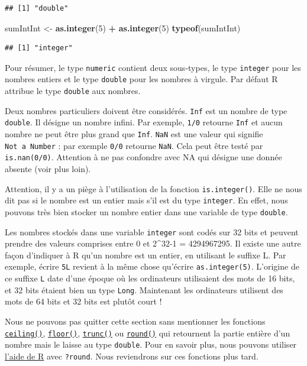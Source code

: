 \documentclass[
]{book}
\newenvironment{Shaded}{\begin{snugshade}}{\end{snugshade}}
\newcommand{\DecValTok}[1]{\textcolor[rgb]{0.00,0.00,0.81}{#1}}
\newcommand{\KeywordTok}[1]{\textcolor[rgb]{0.13,0.29,0.53}{\textbf{#1}}}
\newcommand{\NormalTok}[1]{#1}
\newcommand{\OperatorTok}[1]{\textcolor[rgb]{0.81,0.36,0.00}{\textbf{#1}}}
\newcommand{\StringTok}[1]{\textcolor[rgb]{0.31,0.60,0.02}{#1}}
\begin{document}
\begin{verbatim}
## [1] "double"
\end{verbatim}

\begin{Shaded}
\begin{Highlighting}[]
\NormalTok{sumIntInt <-}\StringTok{ }\KeywordTok{as.integer}\NormalTok{(}\DecValTok{5}\NormalTok{) }\OperatorTok{+}\StringTok{ }\KeywordTok{as.integer}\NormalTok{(}\DecValTok{5}\NormalTok{)}
\KeywordTok{typeof}\NormalTok{(sumIntInt)}
\end{Highlighting}
\end{Shaded}

\begin{verbatim}
## [1] "integer"
\end{verbatim}

Pour résumer, le type \texttt{numeric} contient deux sous-types, le type \texttt{integer} pour les nombres entiers et le type \texttt{double} pour les nombres à virgule. Par défaut R attribue le type \texttt{double} aux nombres.

Deux nombres particuliers doivent être considérés. \texttt{Inf} est un nombre de type \texttt{double}. Il désigne un nombre infini. Par exemple, \texttt{1/0} retourne \texttt{Inf} et aucun nombre ne peut être plus grand que \texttt{Inf}. \texttt{NaN} est une valeur qui signifie \texttt{Not\ a\ Number} : par exemple \texttt{0/0} retourne \texttt{NaN}. Cela peut être testé par \texttt{is.nan(0/0)}. Attention à ne pas confondre avec NA qui désigne une donnée absente (voir plus loin).

Attention, il y a un piège à l'utilisation de la fonction \texttt{is.integer()}. Elle ne nous dit pas si le nombre est un entier mais s'il est du type \texttt{integer}. En effet, nous pouvons très bien stocker un nombre entier dans une variable de type \texttt{double}.

Les nombres stockés dans une variable \texttt{integer} sont codés sur 32 bits et peuvent prendre des valeurs comprises entre 0 et 2\^{}32-1 = 4294967295. Il existe une autre façon d'indiquer à R qu'un nombre est un entier, en utilisant le suffixe L. Par exemple, écrire \texttt{5L} revient à la même chose qu'écrire \texttt{as.integer(5)}. L'origine de ce suffixe \texttt{L} date d'une époque où les ordinateurs utilisaient des mots de 16 bits, et 32 bits étaient bien un type \texttt{Long}. Maintenant les ordinateurs utilisent des mots de 64 bits et 32 bits est plutôt court !

Nous ne pouvons pas quitter cette section sans mentionner les fonctions \protect\hyperlink{l015round}{\texttt{ceiling()}}, \protect\hyperlink{l015round}{\texttt{floor()}}, \protect\hyperlink{l015round}{\texttt{trunc()}} ou \protect\hyperlink{l015round}{\texttt{round()}} qui retournent la partie entière d'un nombre mais le laisse au type \texttt{double}. Pour en savoir plus, nous pouvons utiliser \protect\hyperlink{l015help}{l'aide de R} avec \texttt{?round}. Nous reviendrons sur ces fonctions plus tard.
\end{document}
